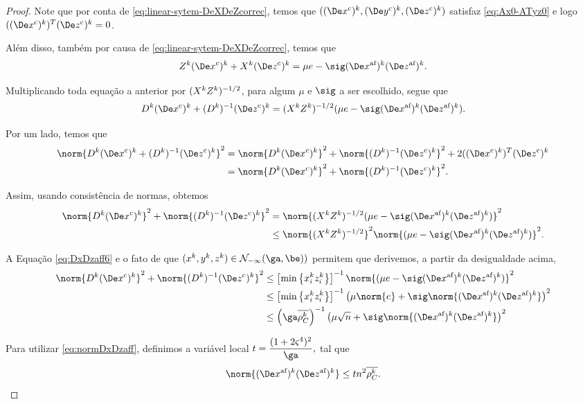 \begin{proof}
	Note que por conta de \eqref{eq:linear-sytem-DeXDeZcorrec}, temos que $(\Dekcox,\Dekcoy,\Dekcoz)$ satisfaz \eqref{eq:Ax0-ATyz0} e logo $(\Dekcox)^{T}\Dekcoz = 0 $. 

	


	Além disso, também por causa de \eqref{eq:linear-sytem-DeXDeZcorrec}, temos que
	\[
	\Zk\Dekcox + \Xk\Dekcoz = \mu e  - \sig \dekx  \dekz .
	\]

	Multiplicando toda equação  a anterior por $(  X^{k} Z^{k}  )^{-1/2}$,  para algum $\mu$ e $\sig$ a ser escolhido, segue que 
	\[
		\Dk\Dekcox + \Dik\Dekcoz = (  \Xk \Zk  )^{-1/2}(\mu e - \sig \dekx  \dekz ).
	\] 

	Por um lado, temos que 
	\[
		\begin{aligned}
		\norm{\Dk\Dekcox + \Dik\Dekcoz}^{2} & = \norm{\Dk\Dekcox}^{2} + \norm{\Dik\Dekcoz}^{2} + 2(\Dekcox)^{T}\Dekcoz  \\ &= \norm{\Dk\Dekcox}^{2} + \norm{\Dik\Dekcoz}^{2}.
		\end{aligned}
	\]

Assim, usando consistência de normas, obtemos
\begin{align*}
	\norm{\Dk\Dekcox}^{2} + \norm{\Dik\Dekcoz}^{2} & = \norm{(  \Xk \Zk  )^{-1/2}(\mu e- \sig \dekx  \dekz )}^{2} \notag\\ 
												& \leq \norm{(  \Xk \Zk  )^{-1/2}}^{2}\norm{(\mu e-  \sig \dekx  \dekz )}^{2} .	
\end{align*}


 A Equação \eqref{eq:DxDzaff6} e o fato de que  $(\xk,\yk,\zk)\in\Nset_{-\infty}(\ga,\be))$ permitem que derivemos, a partir da desigualdade acima, 
\begin{align}
	\norm{\Dk\Dekcox}^{2} + \norm{\Dik\Dekcoz}^{2} 	& \leq \left[\min\left\{\xk_i\zk_i\right\}\right]^{-1}\norm{(\mu e-  \sig \dekx  \dekz )}^{2}\notag\\
	& \leq \left[\min\left\{\xk_i\zk_i\right\}\right]^{-1}\left(\mu\norm{ e} +{\sig}\norm{ \dekx  \dekz }\right)^{2}\notag\\
												& \leq \left(\ga\rhoCkb \right)^{-1}\left(\mu\sqrt{n} +{\sig}\norm{ \dekx  \dekz }\right)^{2} \label{eq:DxDzc1}		
\end{align}

Para utilizar \eqref{eq:normDxDzaff}, definimos a variável local
$
t = \dfrac{(1 + 2\bdxzstar^{4})^{2} }{\ga},
$
tal que 
\[
\norm{ \dekx  \dekz  } \leq t n^{2}\rhoCkb.
\]


\end{proof}
